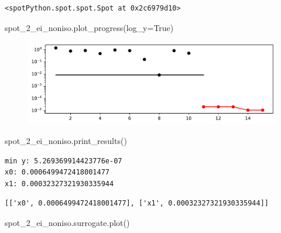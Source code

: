 \documentclass[
  letterpaper,
  DIV=11,
  numbers=noendperiod]{scrreprt}
\newenvironment{Shaded}{\begin{snugshade}}{\end{snugshade}}
\newcommand{\NormalTok}[1]{\textcolor[rgb]{0.00,0.23,0.31}{#1}}
\newcommand{\OperatorTok}[1]{\textcolor[rgb]{0.37,0.37,0.37}{#1}}
\newcommand{\VariableTok}[1]{\textcolor[rgb]{0.07,0.07,0.07}{#1}}
\begin{document}
\begin{verbatim}
<spotPython.spot.spot.Spot at 0x2c6979d10>
\end{verbatim}

\begin{Shaded}
\begin{Highlighting}[]
\NormalTok{spot\_2\_ei\_noniso.plot\_progress(log\_y}\OperatorTok{=}\VariableTok{True}\NormalTok{)}
\end{Highlighting}
\end{Shaded}

\begin{figure}[H]

{\centering \includegraphics{012_num_spot_ei_files/figure-pdf/cell-15-output-1.pdf}

}

\end{figure}

\begin{Shaded}
\begin{Highlighting}[]
\NormalTok{spot\_2\_ei\_noniso.print\_results()}
\end{Highlighting}
\end{Shaded}

\begin{verbatim}
min y: 5.269369914423776e-07
x0: 0.0006499472418001477
x1: 0.00032327321930335944
\end{verbatim}

\begin{verbatim}
[['x0', 0.0006499472418001477], ['x1', 0.00032327321930335944]]
\end{verbatim}

\begin{Shaded}
\begin{Highlighting}[]
\NormalTok{spot\_2\_ei\_noniso.surrogate.plot()}
\end{Highlighting}
\end{Shaded}
\end{document}
